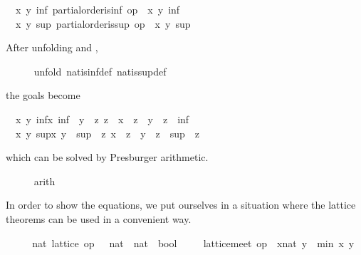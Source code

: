 \begin{isabellebody}
\begin{isamarkuptxt}
\begin{isabelle}
\ {}{\isachardot}\ {\isasymAnd}x\ y{\isachardot}\ {\isasymexists}inf{\isachardot}\ partial{\isacharunderscore}order{\isachardot}is{\isacharunderscore}inf\ op\ {\isasymle}\ x\ y\ inf\isanewline
\ {}{\isachardot}\ {\isasymAnd}x\ y{\isachardot}\ {\isasymexists}sup{\isachardot}\ partial{\isacharunderscore}order{\isachardot}is{\isacharunderscore}sup\ op\ {\isasymle}\ x\ y\ sup%
\end{isabelle}  After unfolding  and ,%
\end{isamarkuptxt}%
\isamarkuptrue%
\ \ \ \ \isamarkupfalse%
\ {\isacharparenleft}unfold\ nat{\isachardot}is{\isacharunderscore}inf{\isacharunderscore}def\ nat{\isachardot}is{\isacharunderscore}sup{\isacharunderscore}def{\isacharparenright}%
\begin{isamarkuptxt}%
the goals become \begin{isabelle}%
\ {}{\isachardot}\ {\isasymAnd}x\ y{\isachardot}\ {\isasymexists}inf{\isasymle}x{\isachardot}\ inf\ {\isasymle}\ y\ {\isasymand}\ {\isacharparenleft}{\isasymforall}z{\isachardot}\ z\ {\isasymle}\ x\ {\isasymand}\ z\ {\isasymle}\ y\ {\isasymlongrightarrow}\ z\ {\isasymle}\ inf{\isacharparenright}\isanewline
\ {}{\isachardot}\ {\isasymAnd}x\ y{\isachardot}\ {\isasymexists}sup{\isasymge}x{\isachardot}\ y\ {\isasymle}\ sup\ {\isasymand}\ {\isacharparenleft}{\isasymforall}z{\isachardot}\ x\ {\isasymle}\ z\ {\isasymand}\ y\ {\isasymle}\ z\ {\isasymlongrightarrow}\ sup\ {\isasymle}\ z{\isacharparenright}%
\end{isabelle} which can be solved
      by Presburger arithmetic.%
\end{isamarkuptxt}%
\isamarkuptrue%
\ \ \ \ \isamarkupfalse%
\ arith{\isacharplus}%
\begin{isamarkuptxt}%
In order to show the equations, we put ourselves in a
    situation where the lattice theorems can be used in a convenient way.%
\end{isamarkuptxt}%
\isamarkuptrue%
\ \ \isamarkupfalse%
\ \isamarkupfalse%
\ nat{\isacharcolon}\ lattice\ {\isachardoublequoteopen}op\ {\isasymle}\ {\isacharcolon}{\isacharcolon}\ nat\ {\isasymRightarrow}\ nat\ {\isasymRightarrow}\ bool{\isachardoublequoteclose}\ \isacommand{{\isachardot}}\isamarkupfalse%
\isanewline
\ \ \isamarkupfalse%
\ {\isachardoublequoteopen}lattice{\isachardot}meet\ op\ {\isasymle}\ {\isacharparenleft}x{\isacharcolon}{\isacharcolon}nat{\isacharparenright}\ y\ {\isacharequal}\ min\ x\ y{\isachardoublequoteclose}\isanewline

\end{isabellebody}
